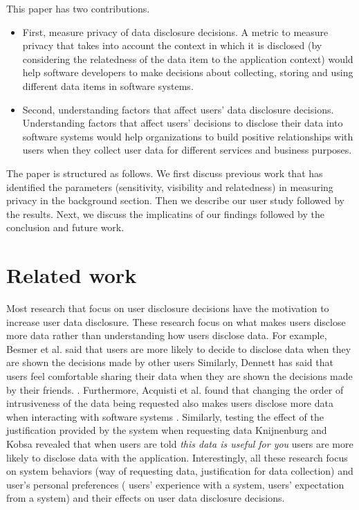 \documentclass[conference]{IEEEtran}
\begin{document}
This paper has two contributions.

\begin{itemize}
\item  First, measure privacy of data disclosure decisions. A metric to measure privacy that takes into account the context in which it is disclosed (by considering the relatedness of the data item to the application context) would help software developers to make decisions about collecting, storing and using different data items in software systems. 
\item Second, understanding factors that affect users' data disclosure decisions. Understanding factors that affect users' decisions to disclose their data into software systems would help organizations to build positive relationships with users when they collect user data for different services and business purposes. 
\end{itemize}

The paper is structured as follows. We first discuss previous work that has identified the parameters (sensitivity, visibility and relatedness) in measuring privacy in the background section. Then we describe our user study followed by the results. Next, we discuss the implicatins of our findings followed by the conclusion and future work.

\section {Related work}

Most research that focus on user disclosure decisions have the motivation to increase user data disclosure. These research focus on what makes users disclose more data rather than understanding how users disclose data. For example, Besmer et al. said that users are more likely to decide to disclose data when they are shown the decisions made by other users \cite {besmer2010impact} Similarly, Dennett has said that users feel comfortable sharing their data when they are shown the decisions made by their friends. \cite {dennett2000little}. Furthermore, Acquisti et al. found that changing the order of intrusiveness of the data being requested also makes users disclose more data when interacting with software systems \cite {acquisti2012impact}. Similarly, testing the effect of the justification provided by the system when requesting data Knijnenburg and Kobsa \cite {knijnenburg2013helping} revealed that when users are told \textit{this data is useful for you} users are more likely to disclose data with the application. Interestingly, all these research focus on system behaviors (way of requesting data, justification for data collection) and user's personal preferences ( users' experience with a system, users' expectation from a system) and their effects on user data disclosure decisions.
\end{document}

